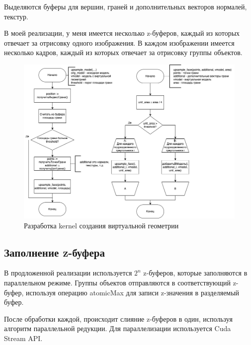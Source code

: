 Выделяются буферы для вершин, граней и дополнительных векторов нормалей, текстур.

В моей реализации, у меня имеется несколько z-буферов, каждый из которых отвечает за отрисовку одного изображения. В каждом изображении имеется несколько кадров, каждый из которых отвечает за отрисовку группы объектов.

\begin{figure}[ph!]
	\centering
	\includegraphics[width=1\linewidth]{inc/img/diagrams-vgeom_upsampler.drawio.png}
	\caption{Разработка kernel создания виртуальной геометрии} 
	\label{fig:vgeom_create_kernel}
\end{figure}

\pagebreak

\subsection{Заполнение z-буфера}

В продложенной реализации используется $ 2^n $ z-буферов, которые заполняются в параллельном режиме.
Группы объектов отправляются в соответствующий z-буфер, используя операцию atomicMax для записи z-значения в разделяемый буфер.

После обработки каждой, происходит слияние z-буферов в один, используя алгоритм параллельной редукции. 
Для параллелизации используется Cuda Stream API.

